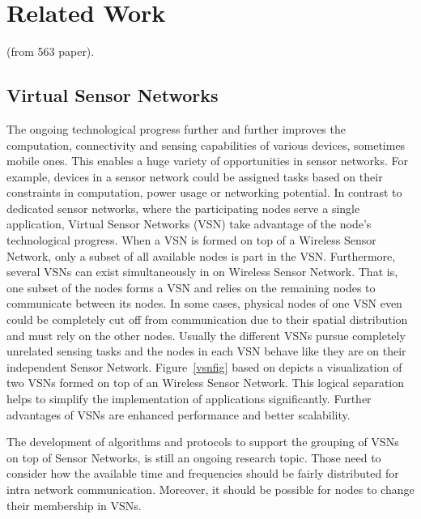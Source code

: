 \chapter{Related Work}
\label{Chapter2}


(from 563 paper).

\section{Virtual Sensor Networks}
The ongoing technological progress further and further improves the computation, connectivity and sensing capabilities of various devices, sometimes mobile ones. \cite{Jayasumana} This enables a huge variety of opportunities in sensor networks. For example, devices in a sensor network could be assigned tasks based on their constraints in computation, power usage or networking potential. In contrast to dedicated sensor networks, where the participating nodes serve a single application, Virtual Sensor Networks (VSN) take advantage of the node’s technological progress. When a VSN is formed on top of a Wireless Sensor Network, only a subset of all available nodes is part in the VSN. Furthermore, several VSNs can exist simultaneously in on Wireless Sensor Network. \cite{Jayasumana} That is, one subset of the nodes forms a VSN and relies on the remaining nodes to communicate between its nodes. In some cases, physical nodes of one VSN even could be completely cut off from communication due to their spatial distribution and must rely on the other nodes. Usually the different VSNs pursue completely unrelated sensing tasks and the nodes in each VSN behave like they are on their independent Sensor Network. Figure~\ref{vsnfig} based on \cite{Jayasumana} depicts a visualization of two VSNs formed on top of an Wireless Sensor Network. This logical separation helps to simplify the implementation of applications significantly. \cite{Jayasumana} Further advantages of VSNs are enhanced performance and better scalability.

The development of algorithms and protocols to support the grouping of VSNs on top of Sensor Networks, is still an ongoing research topic. Those need to consider how the available time and frequencies should be fairly distributed for intra network communication. Moreover, it should be possible for nodes to change their membership in VSNs.

